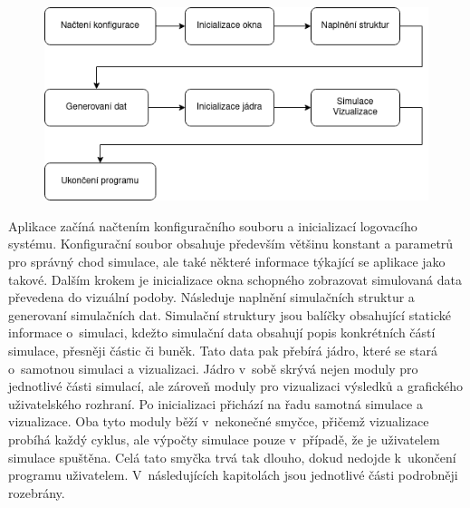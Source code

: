 \begin{figure}[hbt]
	\centering
	\captionsetup{justification=centering}
	\includegraphics[scale=0.6]{obrazky-figures/Simple.png}
	\label{fig:simpleStruct}
\end{figure}

Aplikace začíná načtením konfiguračního souboru a inicializací logovacího systému. Konfigurační soubor obsahuje především většinu konstant a parametrů pro správný chod simulace, ale také některé informace týkající se aplikace jako takové. Dalším krokem je inicializace okna schopného zobrazovat simulovaná data převedena do vizuální podoby. Následuje naplnění simulačních struktur a generovaní simulačních dat. Simulační struktury jsou balíčky obsahující statické informace o~simulaci, kdežto simulační data obsahují popis konkrétních částí simulace, přesněji částic či buněk. Tato data pak přebírá jádro, které se stará o~samotnou simulaci a vizualizaci. Jádro v~sobě skrývá nejen moduly pro jednotlivé části simulací, ale zároveň moduly pro vizualizaci výsledků a grafického uživatelského rozhraní. Po inicializaci přichází na řadu samotná simulace a vizualizace. Oba tyto moduly běží v~nekonečné smyčce, přičemž vizualizace probíhá každý cyklus, ale výpočty simulace pouze v~případě, že je uživatelem simulace spuštěna. Celá tato smyčka trvá tak dlouho, dokud nedojde k~ukončení programu uživatelem. V~následujících kapitolách jsou jednotlivé části podrobněji rozebrány. 

